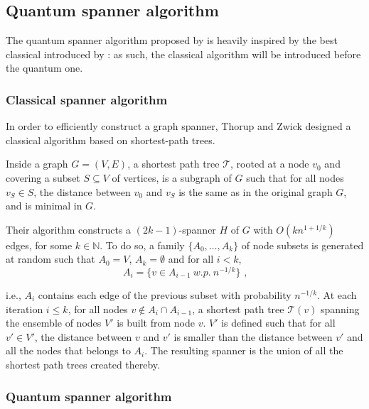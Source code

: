 \subsection{Quantum spanner algorithm}


The quantum spanner algorithm proposed by \citeauthor{apers_quantum_2019} is heavily inspired by the best classical introduced by \citeauthor{Thorup_Zwick_2005} \cite{Thorup_Zwick_2005}: as such, the classical algorithm will be introduced before the quantum one.

\subsubsection{Classical spanner algorithm}

In order to efficiently construct a graph spanner, Thorup and Zwick \cite{Thorup_Zwick_2005} designed a classical algorithm based on shortest-path trees.

\begin{definition}
Inside a graph $G=(V,E)$, a shortest path tree $\mathcal T$, rooted at a node $v_0$ and covering a subset $S\subseteq V$ of vertices,
is a subgraph of $G$ such that for all nodes $v_S \in S$,
the distance between $v_0$ and $v_S$ is the same as in the original graph $G$, and is minimal in $G$.
\end{definition}

Their algorithm constructs a $(2k-1)$-spanner $H$ of $G$ with $O(k n^{1+1/k})$ edges, for some $k\in \mathbb{N}$. To do so, a family $\{A_0,\dots, A_k\}$ of node subsets is generated at random such that $A_0=V$, $A_k = \emptyset$ and for all
$i<k$,
\begin{equation}\label{eq:ai-spanner}
   A_i = \{v \in A_{i-1}\ w.p.\ n^{-1/k}\} \text{ ,}
\end{equation}

i.e., $A_i$ contains each edge of the previous subset with probability $n^{-1/k}$.
At each iteration $i\leq k$, for all nodes $v \notin A_i \cap A_{i-1}$, a shortest
path tree $\mathcal T(v)$ spanning the ensemble of nodes $V'$ is built from node $v$. $V'$ is
defined such that for all $v' \in V'$, the distance between $v$ and $v'$ is smaller
than the distance between $v'$ and all the nodes that belongs to $A_i$. The resulting spanner is
the union of all the shortest path trees created thereby.

\subsubsection{Quantum spanner algorithm}

